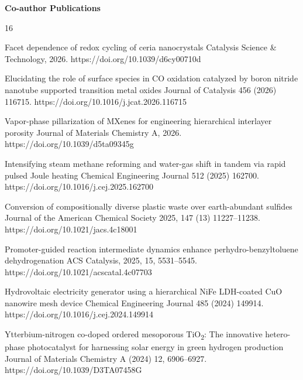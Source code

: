\vspace{6pt}
\textbf{Co-author Publications}
\begin{publist}{16}

    {Facet dependence of redox cycling of ceria nanocrystals}
    {Catalysis Science \& Technology}{, 2026.}
    {https://doi.org/10.1039/d6cy00710d}

    {Elucidating the role of surface species in CO oxidation catalyzed by boron nitride
     nanotube supported transition metal oxides}
    {Journal of Catalysis}{ 456 (2026) 116715.}
    {https://doi.org/10.1016/j.jcat.2026.116715}

    {Vapor-phase pillarization of MXenes for engineering hierarchical interlayer porosity}
    {Journal of Materials Chemistry A}{, 2026.}
    {https://doi.org/10.1039/d5ta09345g}

    {Intensifying steam methane reforming and water-gas shift in tandem via rapid pulsed
     Joule heating}
    {Chemical Engineering Journal}{ 512 (2025) 162700.}
    {https://doi.org/10.1016/j.cej.2025.162700}

    {Conversion of compositionally diverse plastic waste over earth-abundant sulfides}
    {Journal of the American Chemical Society}{ 2025, 147 (13) 11227--11238.}
    {https://doi.org/10.1021/jacs.4c18001}

    {Promoter-guided reaction intermediate dynamics enhance perhydro-benzyltoluene
     dehydrogenation}
    {ACS Catalysis}{, 2025, 15, 5531--5545.}
    {https://doi.org/10.1021/acscatal.4c07703}

    {Hydrovoltaic electricity generator using a hierarchical NiFe LDH-coated CuO nanowire
     mesh device}
    {Chemical Engineering Journal}{ 485 (2024) 149914.}
    {https://doi.org/10.1016/j.cej.2024.149914}

    {Ytterbium-nitrogen co-doped ordered mesoporous TiO\textsubscript{2}: The innovative
     hetero-phase photocatalyst for harnessing solar energy in green hydrogen production}
    {Journal of Materials Chemistry A}{ (2024) 12, 6906--6927.}
    {https://doi.org/10.1039/D3TA07458G}


\end{publist}
